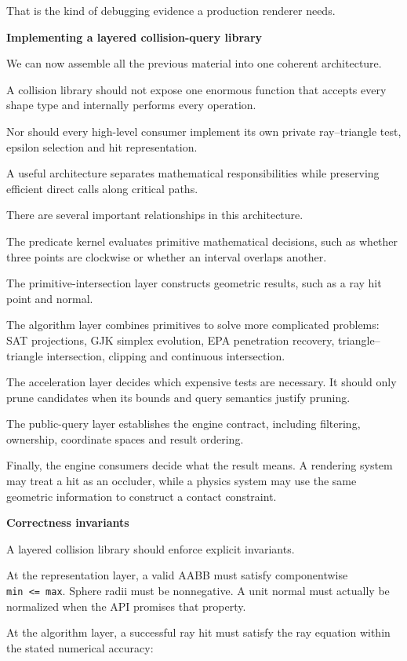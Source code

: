 That is the kind of debugging evidence a production renderer needs.

\textbf{Implementing a layered collision-query library}

We can now assemble all the previous material into one coherent architecture.

A collision library should not expose one enormous function that accepts every shape type and internally performs every operation.

Nor should every high-level consumer implement its own private ray--triangle test, epsilon selection and hit representation.

A useful architecture separates mathematical responsibilities while preserving efficient direct calls along critical paths.

There are several important relationships in this architecture.

The predicate kernel evaluates primitive mathematical decisions, such as whether three points are clockwise or whether an interval overlaps another.

The primitive-intersection layer constructs geometric results, such as a ray hit point and normal.

The algorithm layer combines primitives to solve more complicated problems: SAT projections, GJK simplex evolution, EPA penetration recovery, triangle--triangle intersection, clipping and continuous intersection.

The acceleration layer decides which expensive tests are necessary. It should only prune candidates when its bounds and query semantics justify pruning.

The public-query layer establishes the engine contract, including filtering, ownership, coordinate spaces and result ordering.

Finally, the engine consumers decide what the result means. A rendering system may treat a hit as an occluder, while a physics system may use the same geometric information to construct a contact constraint.

\textbf{Correctness invariants}

A layered collision library should enforce explicit invariants.

At the representation layer, a valid AABB must satisfy componentwise \texttt{min\ \textless{}=\ max}. Sphere radii must be nonnegative. A unit normal must actually be normalized when the API promises that property.

At the algorithm layer, a successful ray hit must satisfy the ray equation within the stated numerical accuracy:

